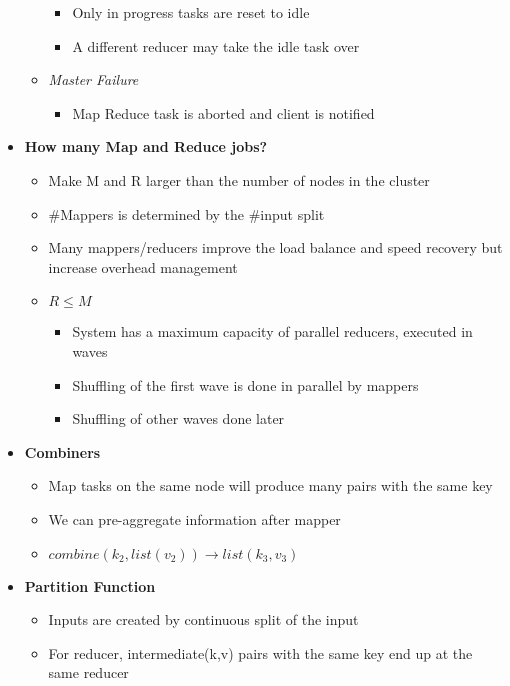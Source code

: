 \documentclass[12pt,oneside]{report}
\begin{document}
\begin{itemize}
\begin{itemize}
        \begin{itemize}
            \item Only in progress tasks are reset to idle
            \item A different reducer may take the idle task over
        \end{itemize}
        \item \textit{Master Failure}
        \begin{itemize}
            \item Map Reduce task is aborted and client is notified
        \end{itemize}
    \end{itemize}
    \item \textbf{How many Map and Reduce jobs?}
    \begin{itemize}
        \item Make M and R larger than the number of nodes in the cluster
        \item \#Mappers is determined by the \#input split
        \item Many mappers/reducers improve the load balance and speed recovery but increase overhead management
        \item \(R \leq M\)
        \begin{itemize}
            \item System has a maximum capacity of parallel reducers, executed in waves
            \item Shuffling of the first wave is done in parallel by mappers
            \item Shuffling of other waves done later
        \end{itemize}
    \end{itemize}
    \item \textbf{Combiners}
    \begin{itemize}
        \item Map tasks on the same node will produce many pairs with the same key
        \item We can pre-aggregate information after mapper
        \item \(combine(k_2,list(v_2)) \rightarrow list(k_3, v_3)\)
    \end{itemize}
    \item \textbf{Partition Function}
    \begin{itemize}
        \item Inputs are created by continuous split of the input
        \item For reducer, intermediate(k,v) pairs with the same key end up at the same reducer

\end{itemize}
\end{itemize}
\end{document}

